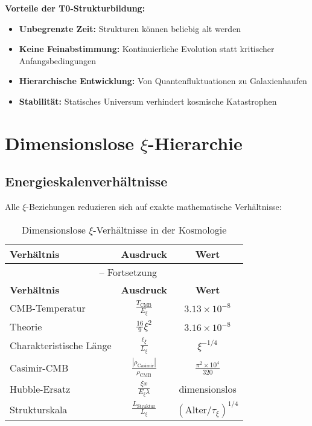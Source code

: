 \documentclass[12pt,a4paper]{article}
\newcommand{\xipar}{\xi}
\newcommand{\Lxi}{L_\xi}
\newcommand{\Exi}{E_\xi}
\newcommand{\rhoCMB}{\rho_{\text{CMB}}}
\newcommand{\rhoCasimir}{\rho_{\text{Casimir}}}
\begin{document}
	\begin{keyresult}
		\textbf{Vorteile der T0-Strukturbildung:}
		
		\begin{itemize}
			\item \textbf{Unbegrenzte Zeit:} Strukturen können beliebig alt werden
			\item \textbf{Keine Feinabstimmung:} Kontinuierliche Evolution statt kritischer Anfangsbedingungen
			\item \textbf{Hierarchische Entwicklung:} Von Quantenfluktuationen zu Galaxienhaufen
			\item \textbf{Stabilität:} Statisches Universum verhindert kosmische Katastrophen
		\end{itemize}
	\end{keyresult}
	
	\section{Dimensionslose $\xi$-Hierarchie}
	
	\subsection{Energieskalenverhältnisse}
	
	Alle $\xi$-Beziehungen reduzieren sich auf exakte mathematische Verhältnisse:
	
	\begin{longtable}{lcc}
		\caption{Dimensionslose $\xi$-Verhältnisse in der Kosmologie} \\
		\toprule
		\textbf{Verhältnis} & \textbf{Ausdruck} & \textbf{Wert} \\
		\midrule
		\endfirsthead
		\multicolumn{3}{c}{\tablename\ \thetable{} -- Fortsetzung} \\
		\toprule
		\textbf{Verhältnis} & \textbf{Ausdruck} & \textbf{Wert} \\
		\midrule
		\endhead
		CMB-Temperatur & $\frac{T_{\text{CMB}}}{\Exi}$ & $3.13 \times 10^{-8}$ \\
		Theorie & $\frac{16}{9}\xipar^2$ & $3.16 \times 10^{-8}$ \\
		Charakteristische Länge & $\frac{\ell_{\xipar}}{\Lxi}$ & $\xipar^{-1/4}$ \\
		Casimir-CMB & $\frac{|\rhoCasimir|}{\rhoCMB}$ & $\frac{\pi^2 \times 10^4}{320}$ \\
		Hubble-Ersatz & $\frac{\xipar x}{\Exi \lambda}$ & dimensionslos \\
		Strukturskala & $\frac{L_{\text{Struktur}}}{\Lxi}$ & $(\text{Alter}/\tau_\xi)^{1/4}$ \\
		\bottomrule
	\end{longtable}
	
\end{document}
